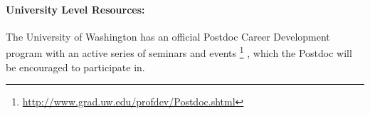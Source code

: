 \documentclass[11pt]{article}
\begin{document}
\paragraph{University Level Resources:}
The University of Washington has an official Postdoc Career Development program 
with an active series of seminars and events%
\footnote{\url{http://www.grad.uw.edu/profdev/Postdoc.shtml}}%
, which the Postdoc will be encouraged to participate in.


\pagebreak



\end{document}

